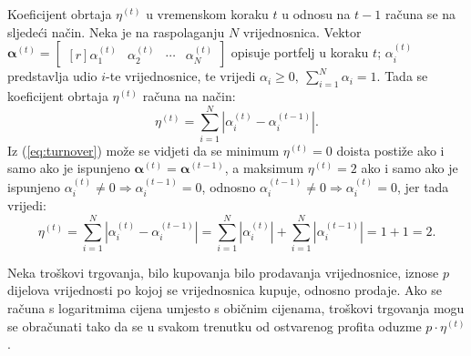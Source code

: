 \documentclass[lmodern, utf8, diplomski, numeric]{fer}
\newcommand{\matr}[1]{\mathbold{#1}}
\newcommand{\q}{\left}
\newcommand{\w}{\right}
\begin{document}
  Koeficijent obrtaja $\eta^{(t)}$ u vremenskom koraku $t$ u odnosu na $t-1$ računa se na sljedeći način.
  Neka je na raspolaganju $N$ vrijednosnica.
  Vektor $\matr{\alpha}^{(t)} = \begin{bmatrix*}[r] \alpha_1^{(t)} & \alpha_2^{(t)} & \cdots & \alpha_N^{(t)} \end{bmatrix*}$ opisuje portfelj u koraku $t$; $\alpha_i^{(t)}$ predstavlja udio $i$-te vrijednosnice, te vrijedi $\alpha_i \ge 0,\ \sum_{i=1}^{N} \alpha_i = 1$.
  Tada se koeficijent obrtaja $\eta^{(t)}$ računa na način:
  \begin{equation}
  \label{eq:turnover}
  \eta^{(t)} = \sum_{i=1}^{N} \q \lvert \alpha_i^{(t)} - \alpha_i^{(t-1)} \w \rvert.
  \end{equation}
  Iz (\ref{eq:turnover}) može se vidjeti da se minimum $\eta^{(t)} = 0$ doista postiže ako i samo ako je ispunjeno $\matr{\alpha}^{(t)} = \matr{\alpha}^{(t-1)}$,
  a maksimum $\eta^{(t)} = 2$ ako i samo ako je ispunjeno $\alpha_i^{(t)} \ne 0 \Rightarrow \alpha_i^{(t - 1)} = 0$, odnosno $\alpha_i^{(t - 1)} \ne 0 \Rightarrow \alpha_i^{(t)} = 0$, jer tada vrijedi: 
  \begin{equation*}
  \eta^{(t)} = \sum_{i=1}^{N} \q \lvert \alpha_i^{(t)} - \alpha_i^{(t-1)} \w \rvert = \sum_{i=1}^{N} \q \lvert \alpha_i^{(t)}\w \rvert + \sum_{i=1}^N \q \lvert\alpha_i^{(t-1)} \w \rvert = 1 + 1 = 2.
  \end{equation*}
  
  Neka troškovi trgovanja, bilo kupovanja bilo prodavanja vrijednosnice, iznose $p$ dijelova vrijednosti po kojoj se vrijednosnica kupuje, odnosno prodaje.
  Ako se računa s logaritmima cijena umjesto s običnim cijenama, troškovi trgovanja mogu se obračunati tako da se u svakom trenutku od ostvarenog profita oduzme $p \cdot \eta^{(t)}$.
  
%  
  
\end{document}
